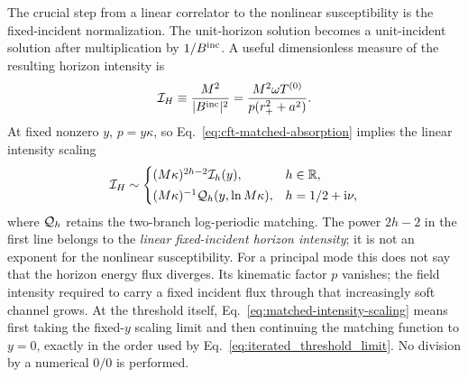 \documentclass[aps,prd,twocolumn,10pt,nofootinbib,superscriptaddress,floatfix]{revtex4-2}
\newcommand{\ii}{\mathrm{i}}
\begin{document}
The crucial step from a linear correlator to the nonlinear susceptibility is
the fixed-incident normalization.  The unit-horizon solution becomes a
unit-incident solution after multiplication by $1/B^{\rm inc}$.  A useful
dimensionless measure of the resulting horizon intensity is
\begin{equation}
 {\cal I}_H\equiv\frac{M^2}{|B^{\rm inc}|^2}
 =\frac{M^2\omega T^{(0)}}{p(r_+^2+a^2)}.
 \label{eq:fixed-flux-throat-intensity}
\end{equation}
At fixed nonzero $y$, $p=y\kappa$, so Eq.~\eqref{eq:cft-matched-absorption}
implies the linear intensity scaling
\begin{equation}
 {\cal I}_H\sim
 \begin{cases}
 (M\kappa)^{2h-2}{\cal I}_h(y), & h\in\mathbb{R},\\[2pt]
 (M\kappa)^{-1}{\cal Q}_h(y,\ln M\kappa),
 & h=1/2+\ii\nu,
 \end{cases}
 \label{eq:matched-intensity-scaling}
\end{equation}
where ${\cal Q}_h$ retains the two-branch log-periodic matching.  The power
$2h-2$ in the first line belongs to the \emph{linear fixed-incident horizon
intensity}; it is not an exponent for the nonlinear susceptibility.
For a principal mode this does not say that the horizon energy flux diverges.
Its kinematic factor $p$ vanishes; the field intensity required to carry a
fixed incident flux through that increasingly soft channel grows.  At the threshold itself,
Eq.~\eqref{eq:matched-intensity-scaling} means first taking the fixed-$y$
scaling limit and then continuing the matching function to $y=0$, exactly in the
order used by Eq.~\eqref{eq:iterated_threshold_limit}.  No division by a
numerical $0/0$ is performed.
\end{document}

